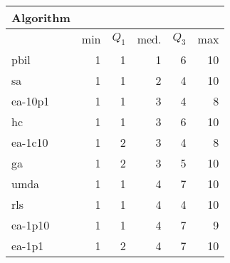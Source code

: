 \begin{tabular}{@{} l *{5}{>{{}}n{2}{0}} @{}}
\toprule
{Algorithm} &  \\
\midrule
& {min} & {$Q_1$} & {med.} & {$Q_3$} & {max} \\
\midrule
pbil & 1 & 1 & 1 & 6 & 10 \\
sa & 1 & 1 & 2 & 4 & 10 \\
ea-10p1 & 1 & 1 & 3 & 4 & 8 \\
hc & 1 & 1 & 3 & 6 & 10 \\
ea-1c10 & 1 & 2 & 3 & 4 & 8 \\
ga & 1 & 2 & 3 & 5 & 10 \\
umda & 1 & 1 & 4 & 7 & 10 \\
rls & 1 & 1 & 4 & 4 & 10 \\
ea-1p10 & 1 & 1 & 4 & 7 & 9 \\
ea-1p1 & 1 & 2 & 4 & 7 & 10 \\
\bottomrule
\end{tabular}
